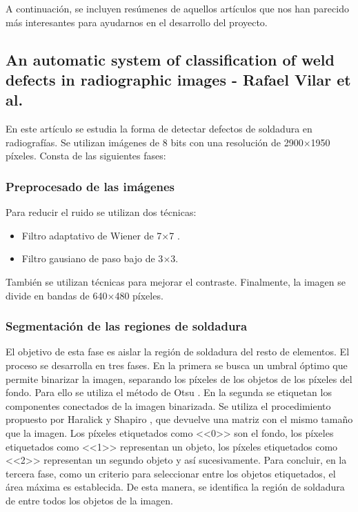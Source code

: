A continuación, se incluyen resúmenes de aquellos artículos que nos han parecido más interesantes para ayudarnos en el desarrollo del proyecto.


\subsection{An automatic system of classification of weld defects in radiographic images - Rafael Vilar et al.}
En este artículo \cite{vilar2009automatic} se estudia la forma de detectar defectos de soldadura en radiografías. Se utilizan imágenes de 8 bits con una resolución de 2900$\times$1950 píxeles. Consta de las siguientes fases:


\subsubsection{Preprocesado de las imágenes}
Para reducir el ruido se utilizan dos técnicas:
	\begin{itemize}
	\item Filtro adaptativo de Wiener de 7$\times$7 \cite{wiener1949extrapolation}.
	\item Filtro gausiano de paso bajo de 3$\times$3.
	\end{itemize}
También se utilizan técnicas para mejorar el contraste.
Finalmente, la imagen se divide en bandas de 640$\times$480 píxeles. 


\subsubsection{Segmentación de las regiones de soldadura}
El objetivo de esta fase es aislar la región de soldadura del resto de elementos. El proceso se desarrolla en tres fases. 
En la primera se busca un umbral óptimo que permite binarizar la imagen, separando los píxeles de los objetos de los píxeles del fondo. Para ello se utiliza el método de Otsu \cite{otsu1979threshold}.
En la segunda se etiquetan los componentes conectados de la imagen binarizada. Se utiliza el procedimiento propuesto por Haralick y Shapiro \cite{haralick1992computer}, que devuelve una matriz con el mismo tamaño que la imagen. Los píxeles etiquetados como <<0>> son el fondo, los píxeles etiquetados como <<1>> representan un objeto, los píxeles etiquetados como <<2>> representan un segundo objeto y así sucesivamente.
Para concluir, en la tercera fase, como un criterio para seleccionar entre los objetos etiquetados, el área máxima es establecida. De esta manera, se identifica la región de soldadura de entre todos los objetos de la imagen.


